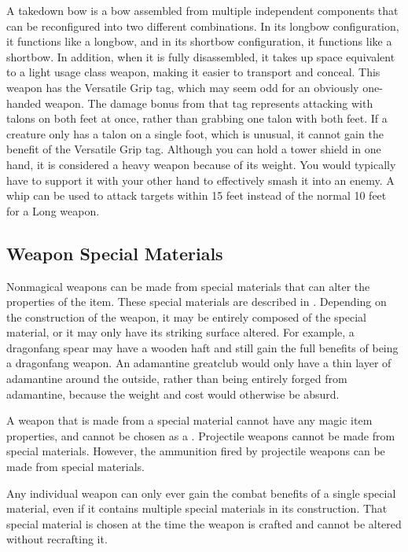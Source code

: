          A takedown bow is a bow assembled from multiple independent components that can be reconfigured into two different combinations.
        In its longbow configuration, it functions like a longbow, and in its shortbow configuration, it functions like a shortbow.
        In addition, when it is fully disassembled, it takes up space equivalent to a light usage class weapon, making it easier to transport and conceal.
         This weapon has the Versatile Grip tag, which may seem odd for an obviously one-handed weapon.
        The damage bonus from that tag represents attacking with talons on both feet at once, rather than grabbing one talon with both feet.
        If a creature only has a talon on a single foot, which is unusual, it cannot gain the benefit of the Versatile Grip tag.
         Although you can hold a tower shield in one hand, it is considered a heavy weapon because of its weight.
        You would typically have to support it with your other hand to effectively smash it into an enemy.
         A whip can be used to attack targets within 15 feet instead of the normal 10 feet for a Long weapon.

    \subsection{Weapon Special Materials}\label{Weapon Special Materials}
        Nonmagical weapons can be made from special materials that can alter the properties of the item.
        These special materials are described in .
        Depending on the construction of the weapon, it may be entirely composed of the special material, or it may only have its striking surface altered.
        For example, a dragonfang spear may have a wooden haft and still gain the full benefits of being a dragonfang weapon.
        An adamantine greatclub would only have a thin layer of adamantine around the outside, rather than being entirely forged from adamantine, because the weight and cost would otherwise be absurd.

        A weapon that is made from a special material cannot have any magic item properties, and cannot be chosen as a .
        Projectile weapons cannot be made from special materials.
        However, the ammunition fired by projectile weapons can be made from special materials.

        Any individual weapon can only ever gain the combat benefits of a single special material, even if it contains multiple special materials in its construction.
        That special material is chosen at the time the weapon is crafted and cannot be altered without recrafting it.

